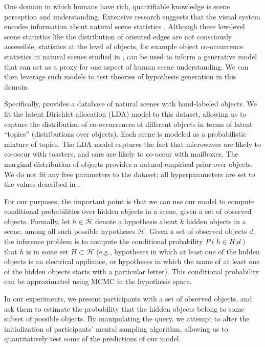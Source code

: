 One domain in which humans have rich, quantifiable knowledge is scene perception and understanding. Extensive research suggests that the visual system encodes information about natural scene statistics \citep{barlow2001exploitation,simoncelli2001natural}.
Although these low-level scene statistics like the distribution of oriented edges are not consciously accessible, statistics at the level of objects, for example object co-occurrence statistics in natural scenes studied in \citet{greene13}, can be used to inform a generative model that can act as a proxy for one aspect of human scene understanding. We can then leverage such models to test theories of hypothesis generation in this domain.

Specifically, \citet{greene13} provides a database of natural scenes with hand-labeled objects. We fit the latent Dirichlet allocation (LDA) model \citep{lda} to this dataset, allowing us to capture the distribution of co-occurrences of different objects in terms of latent ``topics'' (distributions over objects). Each scene is modeled as a probabilistic mixture of topics. The LDA model captures the fact that microwaves are likely to co-occur with toasters, and cars are likely to co-occur with mailboxes. The marginal distribution of objects provides a natural empirical prior over objects. We do not fit any free parameters to the dataset; all hyperparameters are set to the values described in \citet{lda}.


For our purposes, the important point is that we can use our model to compute conditional probabilities over hidden objects in a scene, given a set of observed objects. Formally, let $h \in \mathcal{H}$ denote a hypothesis about $k$ hidden objects in a scene, among all such possible hypotheses $\mathcal{H}$. Given a set of observed objects $d$, the inference problem is to compute the conditional probability $P(h \in H|d)$ that $h$ is in some set $H \subset \mathcal{H}$ (e.g., hypotheses in which at least one of the hidden objects is an electrical appliance, or hypotheses in which the name of at least one of the hidden objects starts with a particular letter). This conditional probability can be approximated using MCMC in the hypothesis space.

In our experiments, we present participants with a set of observed objects, and ask them to estimate the probability that the hidden objects belong to some subset of possible objects. By manipulating the query, we attempt to alter the initialization of participants' mental sampling algorithm, allowing us to quantitatively test some of the predictions of our model. 

